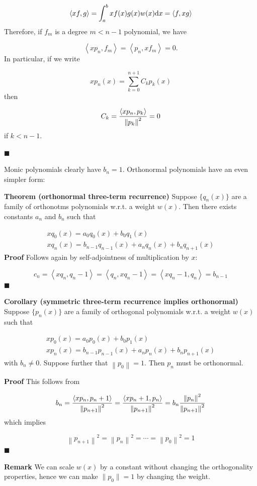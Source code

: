 \documentclass[12pt,a4paper]{article}
\def\D{ {\rm d} }
\def\ip<#1>{\left\langle{#1}\right\rangle}
\def\dx{\D x}
\def\norm#1{\left\| #1 \right\|}
\begin{document}
\[
\ip<x f, g> = \int_a^b x f(x) g(x) w(x) \dx = \ip<f, x g>
\]
Therefore, if $f_m$ is a degree $m < n-1$ polynomial, we have

\[
\ip<x p_n, f_m> = \ip<p_n, x f_m> = 0.
\]
In particular, if we write

\[
x p_n(x) = \sum_{k=0}^{n+1} C_k p_k(x)
\]
then

\[
C_k = {\ip< x p_n, p_k> \over \norm{p_k}^2} = 0
\]
if $k < n-1$.

\ensuremath{\blacksquare}

Monic polynomials clearly have $b_n = 1$.  Orthonormal polynomials have an even simpler form:

\textbf{Theorem (orthonormal three-term recurrence)} Suppose $\{q_n(x)\}$ are a family of orthonotms polynomials w.r.t. a weight $w(x)$.  Then there exists constants $a_n$ and $b_n$ such that


\begin{align*}
x q_0(x) = a_0 q_0(x)  + b_0 q_1(x)\\
x q_n(x) = b_{n-1} q_{n-1}(x) + a_n q_n(x) + b_{n} q_{n+1}(x)
\end{align*}
\textbf{Proof} Follows again by self-adjointness of multiplication by $x$:

\[
c_n = \ip<x q_n, q_{n-1}> = \ip<q_n, x q_{n-1}> = \ip<x q_{n-1}, q_n> = b_{n-1}
\]
\ensuremath{\blacksquare}

\textbf{Corollary (symmetric three-term recurrence implies orthonormal)} Suppose $\{p_n(x)\}$ are a family of orthogonal polynomials  w.r.t. a weight $w(x)$ such that


\begin{align*}
x p_0(x) = a_0 p_0(x)  + b_0 p_1(x)\\
x p_n(x) = b_{n-1} p_{n-1}(x) + a_n p_n(x) + b_{n} p_{n+1}(x)
\end{align*}
with $b_n \neq 0$. Suppose further that $\norm{p_0} = 1$. Then $p_n$ must be orthonormal.

\textbf{Proof} This follows from

\[
b_n = {\ip<x p_n,p_{n+1}> \over \norm{p_{n+1}}^2} = {\ip<x p_{n+1}, p_n> \over \norm{p_{n+1}}^2} = b_n   {\norm{p_n}^2 \over \norm{p_{n+1}}^2 }
\]
which implies

\[
\norm{p_{n+1}}^2 = \norm{p_n}^2 = \cdots = \norm{p_0}^2 = 1
\]
\ensuremath{\blacksquare}

\textbf{Remark} We can scale $w(x)$ by a constant without changing the orthogonality properties, hence we can make $\|p_0\| = 1$ by changing the weight.
\end{document}
